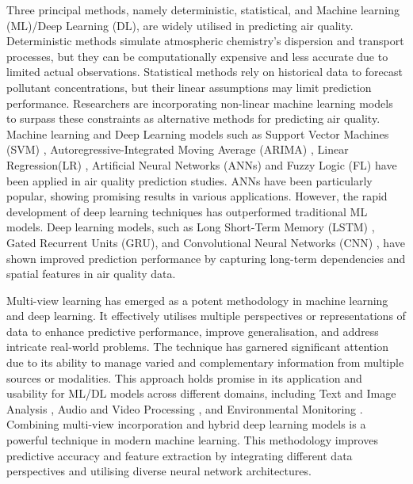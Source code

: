 \par Three principal methods,  namely deterministic,  statistical,  and Machine learning (ML)/Deep Learning (DL),  are widely utilised in predicting air quality. Deterministic methods simulate atmospheric chemistry's dispersion and transport processes,  but they can be computationally expensive and less accurate due to limited actual observations. Statistical methods rely on historical data to forecast pollutant concentrations,  but their linear assumptions may limit prediction performance. Researchers are incorporating non-linear machine learning models to surpass these constraints as alternative methods for predicting air quality. Machine learning and Deep Learning models such as Support Vector Machines (SVM) \cite{lin2011forecasting}, Autoregressive-Integrated Moving Average (ARIMA) \cite{kumari2022machine},  Linear Regression(LR) \cite{kumari2022deep},  Artificial Neural Networks (ANNs) \cite{taylan2017modelling} and Fuzzy Logic (FL) \cite{wang2015model} have been applied in air quality prediction studies. ANNs have been particularly popular,  showing promising results in various applications. However,  the rapid development of deep learning techniques has outperformed traditional ML models. Deep learning models,  such as Long Short-Term Memory (LSTM) \cite{kristiani2022short},  Gated Recurrent Units (GRU),  and Convolutional Neural Networks (CNN) \cite{ayturan2018air},  have shown improved prediction performance by capturing long-term dependencies and spatial features in air quality data.
\par Multi-view learning \cite{zhao2017multi, xu2013survey} has emerged as a potent methodology in machine learning and deep learning. It effectively utilises multiple perspectives or representations of data to enhance predictive performance,  improve generalisation,  and address intricate real-world problems. The technique has garnered significant attention due to its ability to manage varied and complementary information from multiple sources or modalities. This approach holds promise in its application and usability for ML/DL models across different domains,  including Text and Image Analysis \cite{yang2020image, nie2017auto,YAN2021106, KUMAR2023101959,},  Audio and Video Processing \cite{garcia2018multi, hussain2021comprehensive, YAN2021106, KUMAR2023101959,},  and Environmental Monitoring \cite{huang2017multi}. Combining multi-view incorporation and hybrid deep learning models is a powerful technique in modern machine learning. This methodology improves predictive accuracy and feature extraction by integrating different data perspectives and utilising diverse neural network architectures. 
